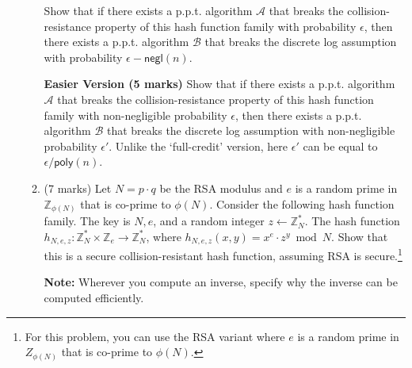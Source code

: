 \documentclass[11pt]{article}
\newcommand{\poly}{\mathsf{poly}}
\newcommand{\negl}{\mathsf{negl}}
\newcommand{\Z}{\mathbb{Z}}
\newcommand{\calA}{\mathcal{A}}
\newcommand{\calB}{\mathcal{B}}
\begin{document}
\begin{enumerate}
\begin{enumerate}
            Show that if there exists a p.p.t. algorithm $\calA$ that breaks the collision-resistance property of this hash function family with probability $\epsilon$, then there exists a p.p.t. algorithm $\calB$ that breaks the discrete log assumption with probability $\epsilon - \negl(n)$. 


            \vspace{10pt}

            \textbf{Easier Version (5 marks)} Show that if there exists a p.p.t. algorithm $\calA$ that breaks the collision-resistance property of this hash function family with non-negligible probability $\epsilon$, then there exists a p.p.t. algorithm $\calB$ that breaks the discrete log assumption with non-negligible probability $\epsilon'$. Unlike the `full-credit' version, here $\epsilon'$ can be equal to $\epsilon/\poly(n)$. 


            \vspace{20pt}

            \item (7 marks) Let $N=p\cdot q$ be the RSA modulus and $e$ is a random prime in $\Z_{\phi(N)}$ that is co-prime to $\phi(N)$. Consider the following hash function family. The key is $N, e$, and a random integer $z \gets \Z^*_N$. The hash function $h_{N, e, z}: \Z_N^* \times \Z_e \to \Z_N^*$, where $h_{N, e, z}(x, y) = x^e\cdot z^y \bmod N$. Show that this is a secure collision-resistant hash function, assuming RSA is secure.\footnote{For this problem, you can use the RSA variant where $e$ is a random prime in $Z_{\phi(N)}$ that is co-prime to $\phi(N)$. } 
    
            \textbf{Note: } Wherever you compute an inverse, specify why the inverse can be computed efficiently. 
    

        \end{enumerate}

    \end{enumerate}
\end{document}
